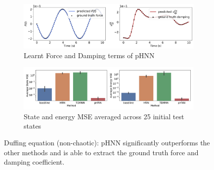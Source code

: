 \documentclass{article}
\begin{document}
\begin{figure}[h!]
\centering
\captionsetup{justification=centering}
	\begin{subfigure}[b]{0.48\textwidth}
		\centering
		\includegraphics[width=\textwidth]{figures/figures/duffing/1/duffing_dpdt_new_0.pdf}
		\caption{Learnt Force and Damping terms of pHNN}
	\end{subfigure}
	\begin{subfigure}[b]{0.48\textwidth}
	    \centering
		\includegraphics[width=\textwidth]{figures/figures/duffing/1/duffing_errors_0.pdf}
		\caption{State and energy MSE averaged across 25 initial test states}
	\end{subfigure}
\caption{Duffing equation (non-chaotic): pHNN significantly outperforms the other methods and is able to extract the ground truth force and damping coefficient.}
\label{fig.duffing}
\end{figure}
\end{document}
